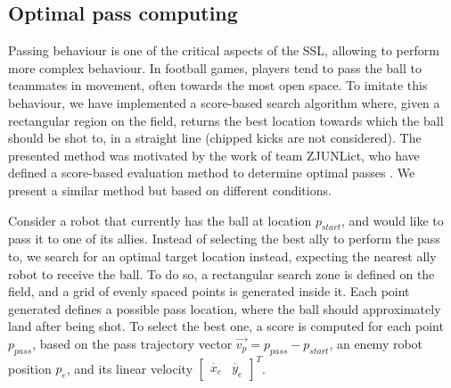 \subsection{Optimal pass computing}

Passing behaviour is one of the critical aspects of the SSL, allowing to perform
more complex behaviour. In football games, players tend to pass the ball to teammates in movement,
often towards the most open space.
To imitate this behaviour, we have implemented a
score-based search algorithm where, given a rectangular region on the field, returns the best location towards
which the ball should be shot to, in a straight line (chipped kicks are not considered).
The presented method was motivated by the work of team ZJUNLict, who have defined a score-based evaluation method to
determine optimal passes \cite{tdp_zjunlict_2020}. We present a similar method but based on different conditions.

Consider a robot that currently has the ball at location $p_{start}$, and would like to pass it to one
of its allies. Instead of selecting the best ally to perform the pass to,
we search for an optimal target location instead, expecting the nearest ally robot
to receive the ball. To do so, a rectangular search zone
is defined on the field, and a grid of evenly spaced points is generated inside it.
Each point generated defines a possible pass location, where the ball should approximately land after being shot.
To select the best one, a score is computed for each point $p_{pass}$,
based on the pass trajectory vector $\overrightarrow{v_p} = p_{pass} - p_{start}$,
an enemy robot position $p_{e}$, and its linear velocity
$\begin{bmatrix}
    \dot{x_e} & \dot{y_e}
\end{bmatrix}^T$.

